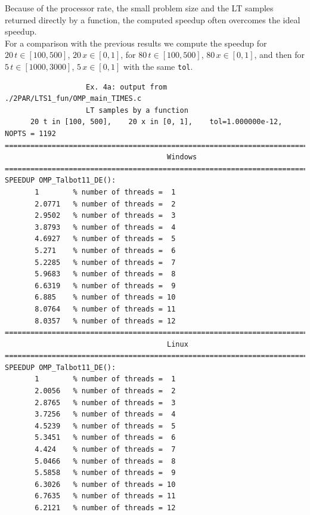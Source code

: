 \documentclass[a4paper,10pt]{report}%
\begin{document}
\noindent Because of the processor rate, the small problem size and the LT samples returned directly by
a function, the computed speedup often overcomes the ideal speedup.
\\
For a comparison with the previous results we compute the speedup for $20\,t\in[100,500]$,
$20\,x\in[0,1]$, for $80\,t\in[100,500]$, $80\,x\in[0,1]$, and then for $5\,t\in[1000,3000]$,
$5\,x\in[0,1]$ with the same {\tt tol}.
\begin{lstlisting}
                   Ex. 4a: output from ./2PAR/LTS1_fun/OMP_main_TIMES.c
                   LT samples by a function
      20 t in [100, 500],    20 x in [0, 1],    tol=1.000000e-12,    NOPTS = 1192
====================================================================================
                                      Windows
====================================================================================
SPEEDUP OMP_Talbot11_DE():
       1        % number of threads =  1
       2.0771   % number of threads =  2
       2.9502   % number of threads =  3
       3.8793   % number of threads =  4
       4.6927   % number of threads =  5
       5.271    % number of threads =  6
       5.2285   % number of threads =  7
       5.9683   % number of threads =  8
       6.6319   % number of threads =  9
       6.885    % number of threads = 10
       8.0764   % number of threads = 11
       8.0357   % number of threads = 12
====================================================================================
                                      Linux
====================================================================================
SPEEDUP OMP_Talbot11_DE():
       1        % number of threads =  1
       2.0056   % number of threads =  2
       2.8765   % number of threads =  3
       3.7256   % number of threads =  4
       4.5239   % number of threads =  5
       5.3451   % number of threads =  6
       4.424    % number of threads =  7
       5.0466   % number of threads =  8
       5.5858   % number of threads =  9
       6.3026   % number of threads = 10
       6.7635   % number of threads = 11
       6.2121   % number of threads = 12


\end{lstlisting}
\end{document}
